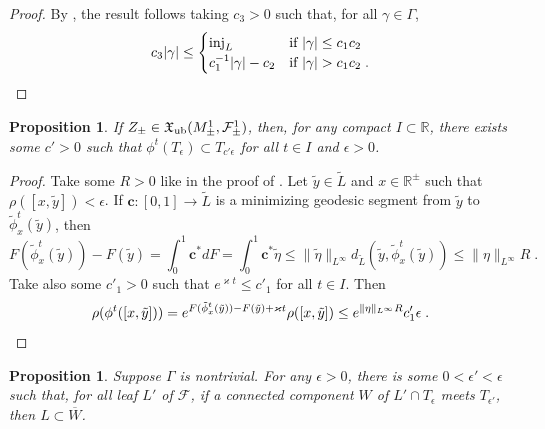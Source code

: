 \documentclass{memo-l}
\theoremstyle{plain}
\newtheorem{prop}[thm]{Proposition}
\theoremstyle{definition}
\theoremstyle{remark}
\newcommand{\R}{\mathbb{R}}
\newcommand{\FF}{\mathcal{F}}
\newcommand{\fX}{\mathfrak{X}}
\newcommand{\bfc}{\boldsymbol{c}}
\newcommand{\inj}{\operatorname{inj}}
\newcommand{\fXub}{\fX_{\text{\rm ub}}}
\numberwithin{section}{chapter}
\numberwithin{equation}{section}%
\begin{document}
\begin{proof}
By , the result follows taking $c_3>0$ such that, for all $\gamma\in\Gamma$,
\[
c_3|\gamma|\le
\begin{cases}
\inj_L & \text{if $|\gamma|\le c_1c_2$}\\
c_1^{-1}|\gamma|-c_2 & \text{if $|\gamma|>c_1c_2$}\;.\qedhere
\end{cases}
\]
\end{proof}

\begin{prop}\label{p: phi^-t(T_epsilon) subset T_kappa epsilon}
If $Z_\pm\in\fXub(M^1_\pm,\FF^1_\pm)$, then, for any compact $I\subset\R$, there exists some $c'>0$ such that $\phi^t(T_\epsilon)\subset T_{c'\epsilon}$ for all $t\in I$ and $\epsilon>0$. 
\end{prop}

\begin{proof}
Take some $R>0$ like in the proof of . Let $\tilde y\in\widetilde L$ and $x\in\R^\pm$ such that $\rho([x,\tilde y])<\epsilon$. If $\bfc:[0,1]\to\widetilde L$ is a minimizing geodesic segment from $\tilde y$ to $\tilde\phi^t_x(\tilde y)$, then
\[
F(\tilde\phi^t_x(\tilde y))-F(\tilde y)=\int_0^1\bfc^*dF=\int_0^1\bfc^*\tilde\eta\le\|\tilde\eta\|_{L^\infty}d_{\widetilde L}(\tilde y,\tilde\phi^t_x(\tilde y))\le\|\eta\|_{L^\infty}R\;.
\]
Take also some $c'_1>0$ such that $e^{\varkappa t}\le c'_1$ for all $t\in I$. Then
\[
\rho(\phi^t([x,\tilde y]))=e^{F(\tilde \phi^t_x(\tilde y))-F(\tilde y)+\varkappa t}\rho([x,\tilde y])\le e^{\|\eta\|_{L^\infty}R}c'_1\epsilon\;.\qedhere
\]
\end{proof}

\begin{prop}\label{p: L subset overline W}
Suppose $\Gamma$ is nontrivial. For any $\epsilon>0$, there is some $0<\epsilon'<\epsilon$ such that, for all leaf $L'$ of $\FF$, if a connected component $W$ of $L'\cap T_\epsilon$ meets $T_{\epsilon'}$, then $L\subset\overline W$.
\end{prop}
\end{document}
